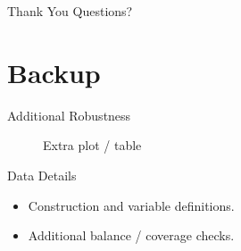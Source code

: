 \documentclass[aspectratio=169,professionalfonts]{beamer}
\newcommand{\figph}[2][0.9\linewidth]{%
  \begin{figure}
    \centering
    \fbox{\rule{0pt}{0.55#1}\rule{#1}{0pt}}%
    \caption{#2}
  \end{figure}
}
\begin{document}
\begin{frame}{Thank You}
  \centering
  \Large Questions?
\end{frame}

\appendix
\section{Backup}

\begin{frame}{Additional Robustness}
  \figph{Extra plot / table}
\end{frame}

\begin{frame}{Data Details}
  \begin{itemize}
    \item Construction and variable definitions.
    \item Additional balance / coverage checks.
  \end{itemize}
\end{frame}
\end{document}
